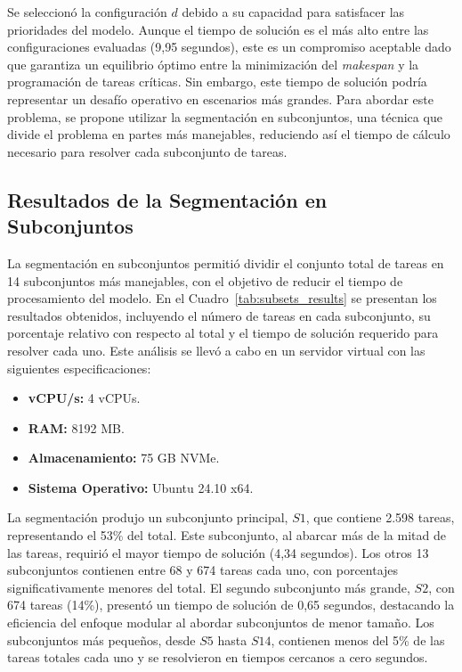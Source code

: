 \documentclass{article}
\begin{document}
Se seleccionó la configuración \( d \) debido a su capacidad para satisfacer las prioridades del modelo. Aunque el tiempo de solución es el más alto entre las configuraciones evaluadas (9,95 segundos), este es un compromiso aceptable dado que garantiza un equilibrio óptimo entre la minimización del \textit{makespan} y la programación de tareas críticas. Sin embargo, este tiempo de solución podría representar un desafío operativo en escenarios más grandes. Para abordar este problema, se propone utilizar la segmentación en subconjuntos, una técnica que divide el problema en partes más manejables, reduciendo así el tiempo de cálculo necesario para resolver cada subconjunto de tareas.

\subsection{Resultados de la Segmentación en Subconjuntos}

La segmentación en subconjuntos permitió dividir el conjunto total de tareas en 14 subconjuntos más manejables, con el objetivo de reducir el tiempo de procesamiento del modelo. En el Cuadro~\ref{tab:subsets_results} se presentan los resultados obtenidos, incluyendo el número de tareas en cada subconjunto, su porcentaje relativo con respecto al total y el tiempo de solución requerido para resolver cada uno. Este análisis se llevó a cabo en un servidor virtual con las siguientes especificaciones:  

\begin{itemize}
    \item \textbf{vCPU/s:} 4 vCPUs.
    \item \textbf{RAM:} 8192 MB.
    \item \textbf{Almacenamiento:} 75 GB NVMe.
    \item \textbf{Sistema Operativo:} Ubuntu 24.10 x64.
\end{itemize}


La segmentación produjo un subconjunto principal, \( S1 \), que contiene 2.598 tareas, representando el 53\% del total. Este subconjunto, al abarcar más de la mitad de las tareas, requirió el mayor tiempo de solución (4,34 segundos). Los otros 13 subconjuntos contienen entre 68 y 674 tareas cada uno, con porcentajes significativamente menores del total. El segundo subconjunto más grande, \( S2 \), con 674 tareas (14\%), presentó un tiempo de solución de 0,65 segundos, destacando la eficiencia del enfoque modular al abordar subconjuntos de menor tamaño. Los subconjuntos más pequeños, desde \( S5 \) hasta \( S14 \), contienen menos del 5\% de las tareas totales cada uno y se resolvieron en tiempos cercanos a cero segundos.
\end{document}
